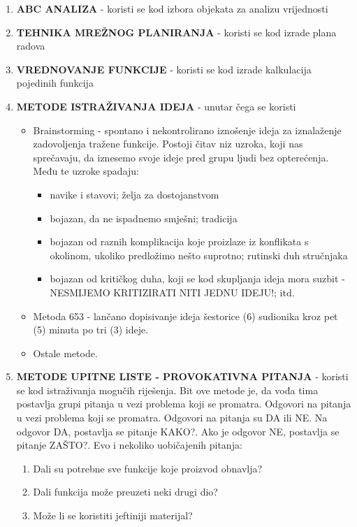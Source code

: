 \documentclass[a4paper,12pt]{article}
\numberwithin{figure}{section}
\begin{document}
\begin{enumerate}
\item \textbf{ABC ANALIZA} - koristi se kod izbora objekata za analizu vrijednosti
\item \textbf{TEHNIKA MREŽNOG PLANIRANJA} - koristi se kod izrade plana radova
\item \textbf{VREDNOVANJE FUNKCIJE} - koristi se kod izrade kalkulacija pojedinih funkcija
\item \textbf{METODE ISTRAŽIVANJA IDEJA} - unutar čega se koristi
\begin{itemize}
\item Brainstorming - spontano i nekontrolirano iznošenje ideja za iznalaženje zadovoljenja tražene funkcije. Postoji čitav niz uzroka, koji nas sprečavaju, da iznesemo svoje ideje pred grupu ljudi bez opterećenja. Među te uzroke spadaju:
\begin{itemize}
\item navike i stavovi; želja za dostojanstvom
\item bojazan, da ne ispadnemo smješni; tradicija
\item bojazan od raznih komplikacija koje proizlaze iz konflikata s okolinom, ukoliko predložimo nešto suprotno; rutinski duh stručnjaka
\item bojazan od kritičkog duha, koji se kod skupljanja ideja mora suzbit - NESMIJEMO KRITIZIRATI NITI JEDNU IDEJU!; itd.
\end{itemize}  
\item Metoda 653 - lančano dopisivanje ideja šestorice (6) sudionika kroz pet (5) minuta po tri (3) ideje.
\item Ostale metode. 
\end{itemize}
\item \textbf{METODE UPITNE LISTE - PROVOKATIVNA PITANJA} - koristi se kod istraživanja mogučih riješenja. Bit ove metode je, da vođa tima postavlja grupi pitanja u vezi problema koji se promatra. Odgovori na pitanja u vezi problema koji se promatra. Odgovori na pitanja su DA ili NE. Na odgovor DA, postavlja se pitanje KAKO?.  Ako je odgovor NE, postavlja se pitanje ZAŠTO?. Evo i nekoliko uobičajenih pitanja:
\begin{center}
\begin{enumerate}
\item Dali su potrebne sve funkcije koje proizvod obnavlja?
\item Dali funkcija može preuzeti neki drugi dio?
\item Može li se koristiti jeftiniji materijal?

\end{enumerate}
\end{center}
\end{enumerate}
\end{document}
